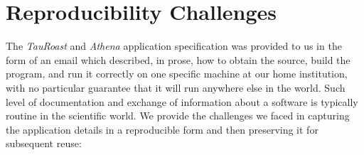 \section{Reproducibility Challenges}

The \emph{TauRoast} and \emph{Athena} application specification was provided to us in the form of an
email which described, in prose, how to obtain the source,
build the program, and run it correctly on one specific
machine at our home institution, with no particular guarantee that
it will run anywhere else in the world. Such level of documentation and exchange of information about a software is typically routine in the scientific world. 
We provide the challenges we faced in capturing the application details in a reproducible form and then preserving it for subsequent reuse:

%
%

